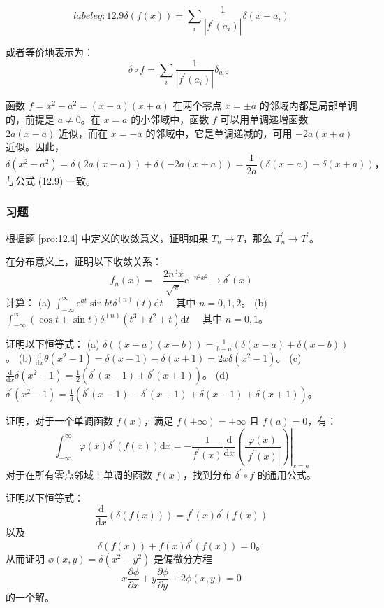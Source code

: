 \begin{equation}label{eq:12.9}
 \delta(f(x)) = \sum_{i} \frac{1}{\left|f^{\prime}(a_i)\right|} \delta(x - a_i) 
 \end{equation}

或者等价地表示为：
 $$
\delta \circ f = \sum_{i} \frac{1}{\left|f^{\prime}(a_i)\right|} \delta_{a_i}。
$$
\begin{eg} \label{eg:12.7} 
函数 $f = x^2 - a^2 = (x - a)(x + a)$ 在两个零点
$x = \pm a$ 的邻域内都是局部单调的，前提是 $a \neq 0$。在 $x = a$
的小邻域中，函数 $f$ 可以用单调递增函数 $2a(x - a)$ 近似，而在
$x = -a$ 的邻域中，它是单调递减的，可用 $-2a(x + a)$ 近似。因此，
 $$
\delta(x^2 - a^2) = \delta(2a(x - a)) + \delta(-2a(x + a)) = \frac{1}{2a}(\delta(x - a) + \delta(x + a))，
$$
与公式 (12.9) 一致。
\end{eg}

\subsubsection*{习题}
\begin{problem}
  根据题 \ref{pro:12.4} 中定义的收敛意义，证明如果
$T_n \rightarrow T$，那么 $T_n^{\prime} \rightarrow T^{\prime}$。


在分布意义上，证明以下收敛关系：
 $$
f_n(x) = -\frac{2 n^3 x}{\sqrt{\pi}} \mathrm{e}^{-n^2 x^2} \rightarrow \delta^{\prime}(x)
$$
计算： (a)
$\int_{-\infty}^\infty \mathrm{e}^{a t} \sin b t \delta^{(n)}(t) \mathrm{d}t \quad$
其中 $n=0,1,2$。 (b)
$\int_{-\infty}^\infty (\cos t + \sin t) \delta^{(n)}\left(t^3 + t^2 + t\right) \mathrm{d}t \quad$
其中 $n=0,1$。
\end{problem}
\begin{problem} 证明以下恒等式： (a)
$\delta((x-a)(x-b)) = \frac{1}{b-a}(\delta(x-a) + \delta(x-b))$。 (b)
$\frac{\mathrm{d}}{\mathrm{d}x} \theta(x^2-1) = \delta(x-1) - \delta(x+1) = 2x \delta(x^2-1)$。
(c)
$\frac{\mathrm{d}}{\mathrm{d}x} \delta(x^2-1) = \frac{1}{2}\left(\delta^{\prime}(x-1) + \delta^{\prime}(x+1)\right)$。
(d)
$\delta^{\prime}(x^2-1) = \frac{1}{4}\left(\delta^{\prime}(x-1) - \delta^{\prime}(x+1) + \delta(x-1) + \delta(x+1)\right)$。

\end{problem}

\begin{problem}
  证明，对于一个单调函数 $f(x)$，满足
$f(\pm \infty) = \pm \infty$ 且 $f(a) = 0$，有：
 $$
\int_{-\infty}^\infty \varphi(x) \delta^{\prime}(f(x)) \mathrm{d}x = -\left.\frac{1}{f^{\prime}(x)} \frac{\mathrm{d}}{\mathrm{d}x}\left(\frac{\varphi(x)}{\left|f^{\prime}(x)\right|}\right)\right|_{x=a}
$$
对于在所有零点邻域上单调的函数 $f(x)$，找到分布
$\delta^{\prime} \circ f$ 的通用公式。
\end{problem} 
\begin{problem}
  证明以下恒等式：
 $$
\frac{\mathrm{d}}{\mathrm{d}x} (\delta(f(x))) = f^{\prime}(x) \delta^{\prime}(f(x))
$$
以及
 $$
\delta(f(x)) + f(x) \delta^{\prime}(f(x)) = 0。
$$
从而证明 $\phi(x, y) = \delta(x^2 - y^2)$ 是偏微分方程
 $$
x \frac{\partial \phi}{\partial x} + y \frac{\partial \phi}{\partial y} + 2 \phi(x, y) = 0
$$
的一个解。
\end{problem}

